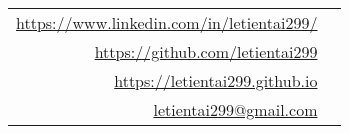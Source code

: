 { %
  \def\arraystretch{1.3}

  \begin{tabular}{
      @{} >{\centering\arraybackslash} r @{\hskip5pt}
       >{\centering\arraybackslash} l @{}
    }
    \href{https://www.linkedin.com/in/letientai299/}{https://www.linkedin.com/in/letientai299/}\\
    \href{https://github.com/letientai299}{https://github.com/letientai299}\\
    \href{https://letientai299.github.io}{https://letientai299.github.io}\\
    \href{mailto:letientai299@gmail.com}{letientai299@gmail.com}
  \end{tabular}
}
